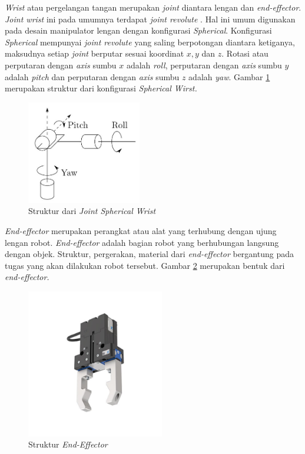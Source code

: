 \textit{Wrist} atau pergelangan tangan merupakan \textit{joint} diantara lengan dan \textit{end-effector}. \textit{Joint wrist} ini pada umumnya terdapat \textit{joint revolute} . Hal ini umum digunakan pada desain manipulator lengan dengan konfigurasi \textit{Spherical}. Konfigurasi \textit{Spherical} mempunyai \textit{joint revolute} yang saling berpotongan diantara ketiganya, maksudnya setiap \textit{joint} berputar sesuai koordinat $x, y $ dan $z$. Rotasi atau perputaran dengan \textit{axis} sumbu $x$ adalah \textit{roll}, perputaran dengan \textit{axis} sumbu $y$ adalah \textit{pitch} dan perputaran dengan \textit{axis} sumbu $z$ adalah \textit{yaw}. Gambar \ref{pic.sphericalwirst} merupakan struktur dari konfigurasi \textit{Spherical Wirst.}
	\begin{figure}[H]
	\centering
	\includegraphics[width=5cm]{gambar/wirst.jpg}
	\caption{Struktur dari \textit{Joint Spherical Wrist}\cite{Spong2006}}
	\label{pic.sphericalwirst}
\end{figure}


\textit{End-effector} merupakan perangkat atau alat yang terhubung dengan ujung lengan robot. \textit{End-effector} adalah bagian robot yang berhubungan langsung dengan objek. Struktur, pergerakan, material dari \textit{end-effector} bergantung pada tugas yang akan dilakukan robot tersebut. Gambar \ref{pic.endeffector} merupakan bentuk dari \textit{end-effector.}
	\begin{figure}[H]
	\centering
	\includegraphics[width=6cm]{gambar/end_effector.jpg}
	\caption{Struktur \textit{End-Effector}\cite{Spong2006}}
	\label{pic.endeffector}
	\end{figure}


